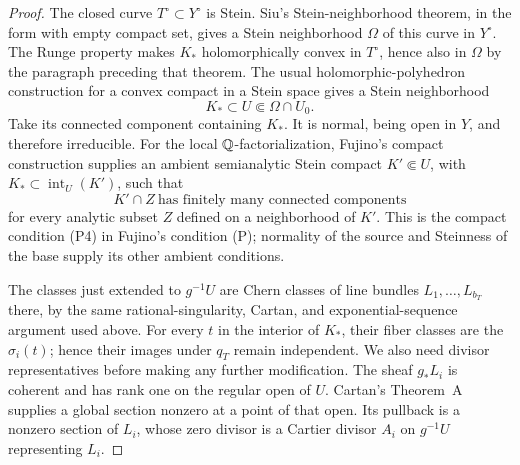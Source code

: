 \begin{proof}
The closed curve \(T^\circ\subset Y^\circ\) is Stein.  Siu's
Stein-neighborhood theorem, in the form
\cite[Theorem~2.1]{ForstnericStein} with empty compact set, gives a
Stein neighborhood \(\Omega\) of this curve in \(Y^\circ\).
The Runge property makes \(K_*\) holomorphically convex in
\(T^\circ\), hence also in \(\Omega\) by the paragraph preceding
that theorem.  The usual holomorphic-polyhedron construction for a
convex compact in a Stein space gives a Stein neighborhood
\[
 K_*\subset U\Subset\Omega\cap U_0.
\]
Take its connected component containing \(K_*\).  It is normal,
being open in \(Y\), and therefore irreducible.  For the local
\(\mathbb{Q}\)-factorialization, Fujino's compact construction
\cite[Section~1.11]{FujinoAnalyticMMP} supplies an ambient semianalytic
Stein compact \(K'\Subset U\), with
\(K_*\subset\operatorname{int}_U(K')\), such that
\[
 K'\cap Z\ \text{has finitely many connected components}
\]
for every analytic subset \(Z\) defined on a neighborhood of
\(K'\).  This is the compact condition (P4) in Fujino's condition
(P); normality of the source and Steinness of the base supply its
other ambient conditions.

The classes just extended to \(g^{-1}U\) are Chern classes of line
bundles \(L_1,\ldots,L_{b_T}\) there, by the same rational-singularity,
Cartan, and exponential-sequence argument used above.  For every
\(t\) in the interior of \(K_*\), their fiber classes are the
\(\sigma_i(t)\); hence their images under \(q_T\) remain independent.
We also need divisor representatives before making any further
modification.  The sheaf \(g_*L_i\) is coherent and has rank one on
the regular open of \(U\).  Cartan's Theorem~A supplies a global
section nonzero at a point of that open.  Its pullback is a nonzero
section of \(L_i\), whose zero divisor is a Cartier divisor \(A_i\)
on \(g^{-1}U\) representing \(L_i\).


\end{proof}
